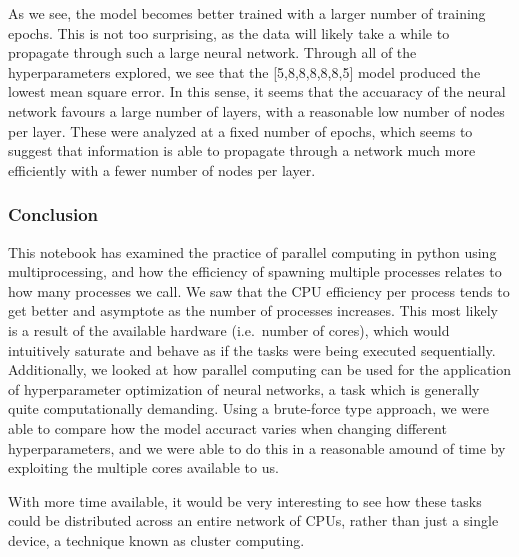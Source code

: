 \documentclass[11pt]{article}
\begin{document}
    As we see, the model becomes better trained with a larger number of
training epochs. This is not too surprising, as the data will likely
take a while to propagate through such a large neural network. Through
all of the hyperparameters explored, we see that the {[}5,8,8,8,8,8,5{]}
model produced the lowest mean square error. In this sense, it seems
that the accuaracy of the neural network favours a large number of
layers, with a reasonable low number of nodes per layer. These were
analyzed at a fixed number of epochs, which seems to suggest that
information is able to propagate through a network much more efficiently
with a fewer number of nodes per layer.

    \hypertarget{conclusion}{%
\subsubsection{Conclusion}\label{conclusion}}

    This notebook has examined the practice of parallel computing in python
using multiprocessing, and how the efficiency of spawning multiple
processes relates to how many processes we call. We saw that the CPU
efficiency per process tends to get better and asymptote as the number
of processes increases. This most likely is a result of the available
hardware (i.e.~number of cores), which would intuitively saturate and
behave as if the tasks were being executed sequentially. Additionally,
we looked at how parallel computing can be used for the application of
hyperparameter optimization of neural networks, a task which is
generally quite computationally demanding. Using a brute-force type
approach, we were able to compare how the model accuract varies when
changing different hyperparameters, and we were able to do this in a
reasonable amound of time by exploiting the multiple cores available to
us.

With more time available, it would be very interesting to see how these
tasks could be distributed across an entire network of CPUs, rather than
just a single device, a technique known as cluster computing.


    
    
    
    
\end{document}
